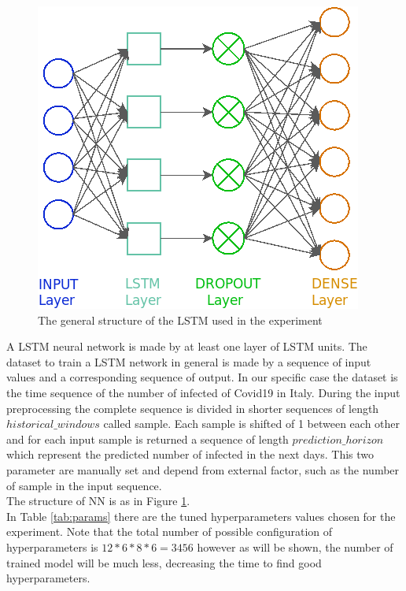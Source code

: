 \documentclass[letterpaper]{article}%
\begin{document}
\begin{figure}[!h]
	\includegraphics[width=\columnwidth]{img/LSTM}
	\caption{The general structure of the LSTM used in the experiment}
	\label{fig:LSTM}
\end{figure}
A LSTM neural network is made by at least one layer of LSTM units. The dataset to train a LSTM network in general is made by a sequence of input values and a corresponding sequence of output.
In our specific case the dataset is the time sequence of the number of infected of Covid19 in Italy. During the input preprocessing the complete sequence is divided in shorter sequences of length $ historical\_windows $ called sample. Each sample is shifted of 1 between each other and for each input sample is returned a sequence of length $ prediction\_horizon $ which represent the predicted number of infected in the next days. This two parameter are manually set and depend from external factor, such as the number of sample in the input sequence. \\ The structure of NN is as in Figure \ref{fig:LSTM}.\\ 
In Table \ref{tab:params} there are the tuned hyperparameters values chosen for the experiment. Note that the total number of possible configuration of hyperparameters is $ 12*6*8*6 = 3456 $ however as will be shown, the number of trained model will be much less, decreasing the time to find good hyperparameters.\\
\end{document}
